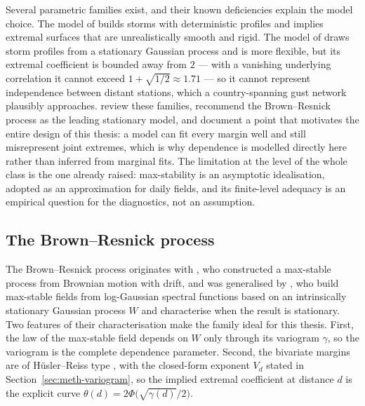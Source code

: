 Several parametric families exist, and their known deficiencies explain the model choice. The model of \citet{smith1990} builds storms with deterministic profiles and implies extremal surfaces that are unrealistically smooth and rigid. The model of \citet{schlather2002} draws storm profiles from a stationary Gaussian process and is more flexible, but its extremal coefficient is bounded away from \(2\) --- with a vanishing underlying correlation it cannot exceed \(1+\sqrt{1/2}\approx1.71\) --- so it cannot represent independence between distant stations, which a country-spanning gust network plausibly approaches. \citet{davison2012} review these families, recommend the Brown--Resnick process as the leading stationary model, and document a point that motivates the entire design of this thesis: a model can fit every margin well and still misrepresent joint extremes, which is why dependence is modelled directly here rather than inferred from marginal fits. The limitation at the level of the whole class is the one already raised: max-stability is an asymptotic idealisation, adopted as an approximation for daily fields, and its finite-level adequacy is an empirical question for the diagnostics, not an assumption.

\subsection{The Brown--Resnick process}\label{sec:lit-br}

The Brown--Resnick process originates with \citet{brown1977}, who constructed a max-stable process from Brownian motion with drift, and was generalised by \citet{kabluchko2009}, who build max-stable fields from log-Gaussian spectral functions based on an intrinsically stationary Gaussian process \(W\) and characterise when the result is stationary. Two features of their characterisation make the family ideal for this thesis. First, the law of the max-stable field depends on \(W\) only through its variogram \(\gamma\), so the variogram is the complete dependence parameter. Second, the bivariate margins are of H\"usler--Reiss type \citep{husler1989}, with the closed-form exponent \(V_d\) stated in Section~\ref{sec:meth-variogram}, so the implied extremal coefficient at distance \(d\) is the explicit curve \(\theta(d)=2\Phi\bigl(\sqrt{\gamma(d)}/2\bigr)\).

